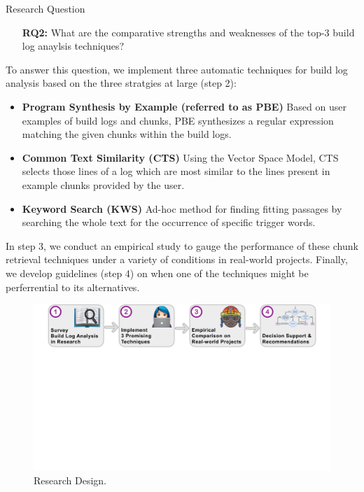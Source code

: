 \begin{simplebox}[minipage boxed title*=-5cm]{Research Question}
\begin{itemize}
  \item[\textbf{RQ2:}] What are the comparative strengths and weaknesses
  of the top-3 build log anaylsis techniques?
\end{itemize}
\end{simplebox}

To answer this question, we implement three automatic techniques for
build log analysis based on the three stratgies at large (step 2):

\begin{itemize}
  \item \textbf{Program Synthesis by Example (referred to as PBE)}
  Based on user examples of build logs and chunks, PBE
  synthesizes
  a regular expression matching the given chunks within the build logs.
  \item \textbf{Common Text Similarity (CTS)}
  Using the Vector Space Model, CTS selects those lines of a log which are
  most similar to the lines present in example chunks provided by
  the user.
  \item \textbf{Keyword Search (KWS)}
  Ad-hoc method for finding fitting passages by searching the whole
  text for
  the occurrence of specific trigger words.
\end{itemize}


In step 3, we conduct an empirical study to gauge the performance of
these chunk retrieval techniques under a variety of conditions in
real-world projects.
Finally, we develop guidelines (step 4) on when
one of the techniques might be perferrential to its alternatives.


\begin{figure}[htb]
	\centering
	\includegraphics[width=\textwidth, trim={1.2cm 10.5cm 1.2cm 0cm},
	clip]{img/overview.pdf}
	\caption{Research Design.}
	\label{fig:overview}
\end{figure}


